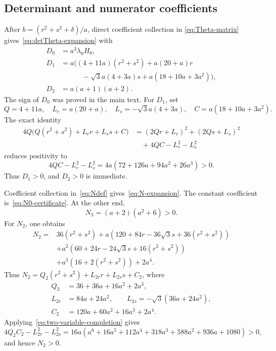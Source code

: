\documentclass[10pt,twoside]{siamart1116}
\begin{document}
\subsection{Determinant and numerator coefficients}\label{app:det-numerator}

After $b=(r^2+s^2+\delta)/a$, direct coefficient collection in
\eqref{eq:Theta-matrix} gives~\eqref{eq:detTheta-expansion} with
\begin{align}
 D_0&=a^3\lambda_0H_0,\nonumber\\
 D_1&=a\bigl((4+11a)(r^2+s^2)+a(20+a)r\nonumber\\
 &\qquad\quad-\sqrt3a(4+3a)s
          +a(18+10a+3a^2)\bigr),\label{eq:Dcoeffs}\\
 D_2&=a(a+1)(a+2).
\end{align}
The sign of $D_0$ was proved in the main text.  For $D_1$, set
\[
 Q=4+11a,\quad L_r=a(20+a),\quad
 L_s=-\sqrt3a(4+3a),\quad C=a(18+10a+3a^2).
\]
The exact identity
\begin{equation}\label{eq:two-variable-completion}
\begin{aligned}
 4Q\bigl(Q(r^2+s^2)+L_rr+L_ss+C\bigr)
  &=(2Qr+L_r)^2+(2Qs+L_s)^2\\
  &\quad+4QC-L_r^2-L_s^2
\end{aligned}
\end{equation}
reduces positivity to
\[
 4QC-L_r^2-L_s^2
 =4a(72+126a+94a^2+26a^3)>0.
\]
Thus $D_1>0$, and $D_2>0$ is immediate.

Coefficient collection in~\eqref{eq:Ndef} gives~\eqref{eq:N-expansion}.
The constant coefficient is~\eqref{eq:N0-certificate}.  At the other end,
\[
 N_3=(a+2)(a^2+6)>0.
\]
For $N_2$, one obtains
\begin{align*}
 N_2={}&36(r^2+s^2)
 +a(120+84r-36\sqrt3s+36(r^2+s^2))\\
 &+a^2(60+24r-24\sqrt3s+16(r^2+s^2))\\
 &+a^3(16+2(r^2+s^2))+2a^4.
\end{align*}
Thus $N_2=Q_2(r^2+s^2)+L_{2r}r+L_{2s}s+C_2$, where
\begin{align*}
 Q_2&=36+36a+16a^2+2a^3,\\
 L_{2r}&=84a+24a^2,\qquad
 L_{2s}=-\sqrt3(36a+24a^2),\\
 C_2&=120a+60a^2+16a^3+2a^4.
\end{align*}
Applying~\eqref{eq:two-variable-completion} gives
\[
 4Q_2C_2-L_{2r}^2-L_{2s}^2
 =16a(a^6+16a^5+112a^4+318a^3+588a^2+936a+1080)>0,
\]
and hence $N_2>0$.
\end{document}
